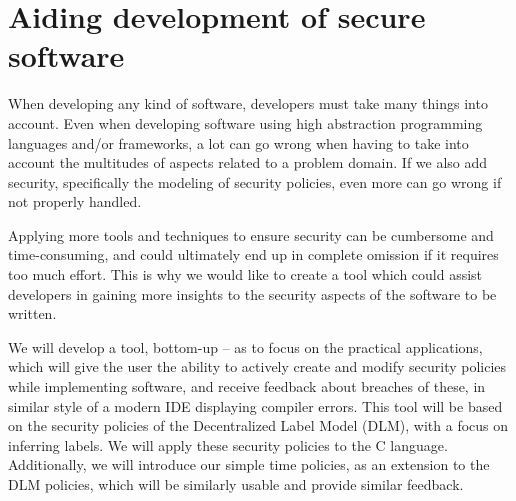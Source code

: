 
\section{Aiding development of secure software}
When developing any kind of software, developers must take many things into account.
Even when developing software using high abstraction programming languages and/or frameworks, a lot can go wrong when having to take into account the multitudes of aspects related to a problem domain.
If we also add security, specifically the modeling of security policies, even more can go wrong if not properly handled.

Applying more tools and techniques to ensure security can be cumbersome and time-consuming, and could ultimately end up in complete omission if it requires too much effort.
This is why we would like to create a tool which could assist developers in gaining more insights to the security aspects of the software to be written.


We will develop a tool, bottom-up -- as to focus on the practical applications, which will give the user the ability to actively create and modify security policies while implementing software, and receive feedback about breaches of these, in similar style of a modern IDE displaying compiler errors.
This tool will be based on the security policies of the Decentralized Label Model (DLM), with a focus on inferring labels.
We will apply these security policies to the C language.
Additionally, we will introduce our simple time policies, as an extension to the DLM policies, which will be similarly usable and provide similar feedback.

